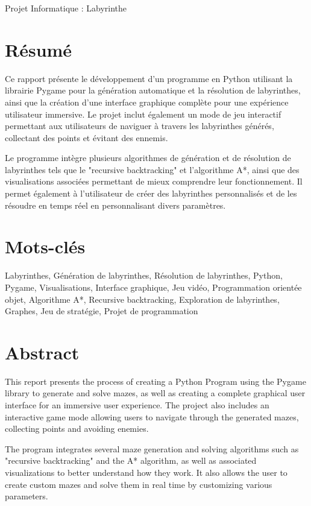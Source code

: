 \documentclass[12pt]{scrreprt} %
\begin{document}
\newpage

\begin{center}
    \Huge
    Projet Informatique : Labyrinthe
\end{center}

\section*{Résumé}

Ce rapport présente le développement d'un programme en Python utilisant la librairie Pygame pour la génération automatique et la résolution de labyrinthes, ainsi que la création d'une interface graphique complète pour une expérience utilisateur immersive. Le projet inclut également un mode de jeu interactif permettant aux utilisateurs de naviguer à travers les labyrinthes générés, collectant des points et évitant des ennemis.

Le programme intègre plusieurs algorithmes de génération et de résolution de labyrinthes tels que le "recursive backtracking" et l'algorithme A*, ainsi que des visualisations associées permettant de mieux comprendre leur fonctionnement. Il permet également à l'utilisateur de créer des labyrinthes personnalisés et de les résoudre en temps réel en personnalisant divers paramètres.

\section*{Mots-clés}

Labyrinthes,
Génération de labyrinthes,
Résolution de labyrinthes,
Python,
Pygame,
Visualisations,
Interface graphique,
Jeu vidéo,
Programmation orientée objet,
Algorithme A*,
Recursive backtracking,
Exploration de labyrinthes,
Graphes,
Jeu de stratégie,
Projet de programmation

\section*{Abstract}

This report presents the process of creating a Python Program using the Pygame library to generate and solve mazes, as well as creating a complete graphical user interface for an immersive user experience. The project also includes an interactive game mode allowing users to navigate through the generated mazes, collecting points and avoiding enemies.

The program integrates several maze generation and solving algorithms such as "recursive backtracking" and the A* algorithm, as well as associated visualizations to better understand how they work. It also allows the user to create custom mazes and solve them in real time by customizing various parameters.
\end{document}
